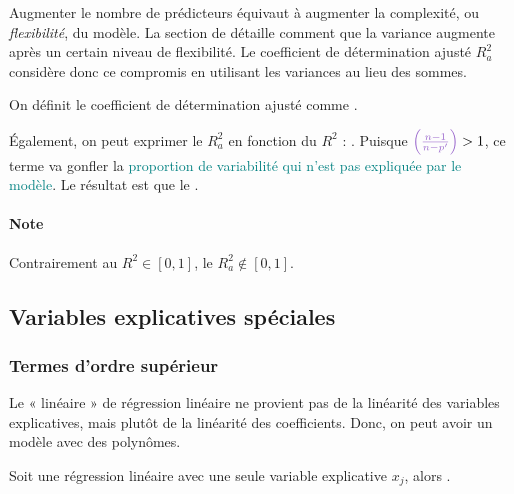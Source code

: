 \documentclass[french]{article}
\begin{document}
\begin{multicols*}{2}
\begin{definitionNOHFILL}
\begin{rappel_enhanced}[Contexte]
\bigskip

Augmenter le nombre de prédicteurs équivaut à augmenter la complexité, ou \textit{flexibilité}, du modèle. La section de \textit{\underline{}} détaille comment que la variance augmente après un certain niveau de flexibilité. Le coefficient de détermination ajusté $R^{2}_{a}$ considère donc ce compromis en utilisant les variances au lieu des sommes. 
\end{rappel_enhanced}

On définit le coefficient de détermination ajusté comme .

\bigskip

Également, on peut exprimer le $R^{2}_{a}$ en fonction du $R^{2}$ : . Puisque $\textcolor{amethyst}{\left(\frac{n - 1}{n - p'}\right)} > 1$,  ce terme va \textcolor{amethyst}{gonfler} la \textcolor{teal}{proportion de variabilité qui n'est pas expliquée par le modèle}. Le résultat est que le .

\paragraph{Note}	Contrairement au $R^{2} \in [0, 1]$, le $R^{2}_{a} \not\in [0, 1]$.
\end{definitionNOHFILL}




\columnbreak
\subsection{Variables explicatives spéciales}
\subsubsection{Termes d'ordre supérieur}
\begin{rappel_enhanced}[Contexte]
Le « linéaire » de régression linéaire ne provient pas de la linéarité des variables explicatives, mais plutôt de la linéarité des coefficients. Donc, on peut avoir un modèle avec des polynômes.
\end{rappel_enhanced}

\begin{definitionNOHFILLsub}
Soit une régression linéaire avec une seule variable explicative $x_{j}$, alors . 


\end{definitionNOHFILLsub}
\end{multicols*}
\end{document}
